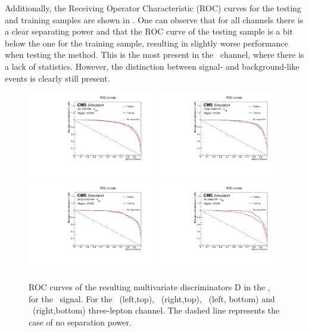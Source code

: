 Additionally, the Receiving Operator Characteristic (ROC) curves for the testing and training samples are shown in . One can observe that for all channels there is a clear separating power and that the ROC curve of the testing sample is a bit below the one for the training sample, resulting in slightly worse performance when testing the method. This is the most present in the \eee\ channel, where there is a lack of statistics. However, the distinction between signal- and background-like events is clearly still present.
\begin{figure}[htbp]
	\centering
	\includegraphics[width=0.49\textwidth]{6_Search/Figures/PlotsTechnics/ROCZutsingletopuuu}
	\includegraphics[width=0.49\textwidth]{6_Search/Figures/PlotsTechnics/ROCZutsingletopuue}
	\includegraphics[width=0.49\textwidth]{6_Search/Figures/PlotsTechnics/ROCZutsingletopeeu}
	\includegraphics[width=0.49\textwidth]{6_Search/Figures/PlotsTechnics/ROCZutsingletopeee}
	\caption{ROC curves of the resulting  multivariate discriminators D in the \STSR, for the \Zut\ signal. For the \mumumu\ (left,top), \emumu\ (right,top), \eemu\ (left, bottom) and \eee\ (right,bottom) three-lepton channel. The dashed line represents the case of no separation power.}
	\label{fig:roczutsingletop}
\end{figure}




